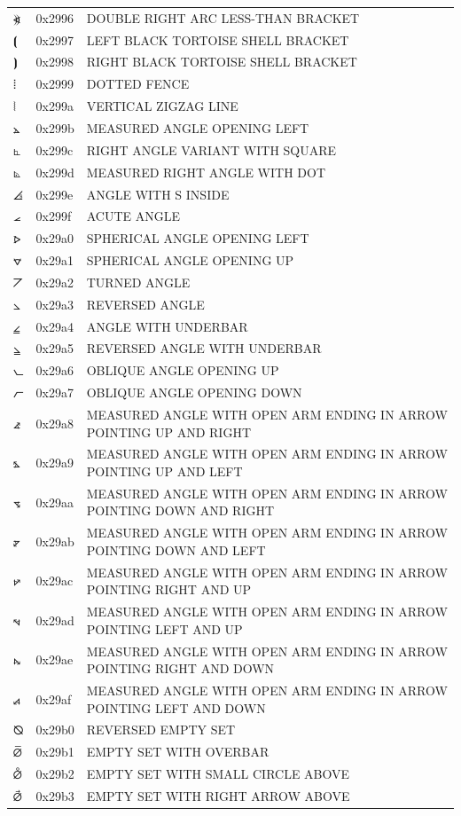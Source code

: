 \documentclass[12pt, twoside]{article}
\begin{document}
\begin{longtable}{L{1.0cm} L{2.0cm} >{\footnotesize}L{10cm}}
$⦖$&0x2996&DOUBLE RIGHT ARC LESS-THAN BRACKET\\
$⦗$&0x2997&LEFT BLACK TORTOISE SHELL BRACKET\\
$⦘$&0x2998&RIGHT BLACK TORTOISE SHELL BRACKET\\
$⦙$&0x2999&DOTTED FENCE\\
$⦚$&0x299a&VERTICAL ZIGZAG LINE\\
$⦛$&0x299b&MEASURED ANGLE OPENING LEFT\\
$⦜$&0x299c&RIGHT ANGLE VARIANT WITH SQUARE\\
$⦝$&0x299d&MEASURED RIGHT ANGLE WITH DOT\\
$⦞$&0x299e&ANGLE WITH S INSIDE\\
$⦟$&0x299f&ACUTE ANGLE\\
$⦠$&0x29a0&SPHERICAL ANGLE OPENING LEFT\\
$⦡$&0x29a1&SPHERICAL ANGLE OPENING UP\\
$⦢$&0x29a2&TURNED ANGLE\\
$⦣$&0x29a3&REVERSED ANGLE\\
$⦤$&0x29a4&ANGLE WITH UNDERBAR\\
$⦥$&0x29a5&REVERSED ANGLE WITH UNDERBAR\\
$⦦$&0x29a6&OBLIQUE ANGLE OPENING UP\\
$⦧$&0x29a7&OBLIQUE ANGLE OPENING DOWN\\
$⦨$&0x29a8&MEASURED ANGLE WITH OPEN ARM ENDING IN ARROW POINTING UP AND RIGHT\\
$⦩$&0x29a9&MEASURED ANGLE WITH OPEN ARM ENDING IN ARROW POINTING UP AND LEFT\\
$⦪$&0x29aa&MEASURED ANGLE WITH OPEN ARM ENDING IN ARROW POINTING DOWN AND RIGHT\\
$⦫$&0x29ab&MEASURED ANGLE WITH OPEN ARM ENDING IN ARROW POINTING DOWN AND LEFT\\
$⦬$&0x29ac&MEASURED ANGLE WITH OPEN ARM ENDING IN ARROW POINTING RIGHT AND UP\\
$⦭$&0x29ad&MEASURED ANGLE WITH OPEN ARM ENDING IN ARROW POINTING LEFT AND UP\\
$⦮$&0x29ae&MEASURED ANGLE WITH OPEN ARM ENDING IN ARROW POINTING RIGHT AND DOWN\\
$⦯$&0x29af&MEASURED ANGLE WITH OPEN ARM ENDING IN ARROW POINTING LEFT AND DOWN\\
$⦰$&0x29b0&REVERSED EMPTY SET\\
$⦱$&0x29b1&EMPTY SET WITH OVERBAR\\
$⦲$&0x29b2&EMPTY SET WITH SMALL CIRCLE ABOVE\\
$⦳$&0x29b3&EMPTY SET WITH RIGHT ARROW ABOVE\\

\end{longtable}
\end{document}
